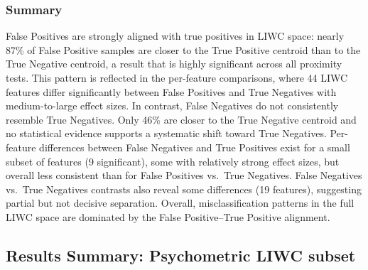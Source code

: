 \subsubsection{Summary}
False Positives are strongly aligned with true positives in LIWC space: nearly 87\% of False Positive samples are closer to the True Positive centroid than to the True Negative centroid, a result that is highly significant across all proximity tests. This pattern is reflected in the per-feature comparisons, where 44 LIWC features differ significantly between False Positives and True Negatives with medium-to-large effect sizes. In contrast, False Negatives do not consistently resemble True Negatives. Only 46\% are closer to the True Negative centroid and no statistical evidence supports a systematic shift toward True Negatives. Per-feature differences between False Negatives and True Positives exist for a small subset of features (9 significant), some with relatively strong effect sizes, but overall less consistent than for False Positives vs.\ True Negatives. False Negatives vs.\ True Negatives contrasts also reveal some differences (19 features), suggesting partial but not decisive separation. Overall, misclassification patterns in the full LIWC space are dominated by the False Positive–True Positive alignment.


\subsection{Results Summary: Psychometric LIWC subset}

